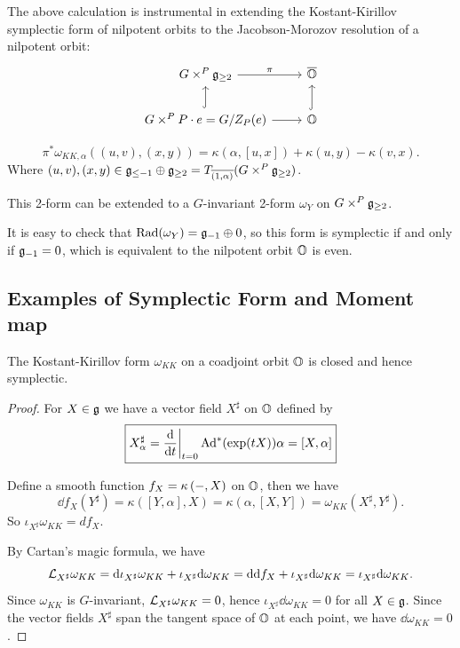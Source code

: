 The above calculation is instrumental in extending the Kostant-Kirillov symplectic form of nilpotent orbits to the Jacobson-Morozov resolution of a nilpotent orbit:
\[
\begin{tikzcd}
  G \times^P \fg_{\geq 2} \arrow[r, "\pi"] & \overline{\BO} \\
  G \times^{P}  P \cdot e = G/Z_P(e) \arrow[r] \arrow[u,hookrightarrow ] & \BO \arrow[u,hookrightarrow ]
\end{tikzcd}
\]

\[
  \pi^* \omega_{KK,\alpha}((u,v),(x,y)) = \kappa(\alpha, [u,x]) + \kappa(u,y) - \kappa(v,x).
\]
Where $(u,v), (x,y) \in \mathfrak{g}_{\leq -1} \oplus \mathfrak{g}_{\geq 2} = T_{\overline{(1,\alpha)}}(G \times^P \mathfrak{g}_{\geq 2})$.

This 2-form can be extended to a $G$-invariant 2-form $\omega_Y$ on $G \times^P \mathfrak{g}_{\geq 2}$.

It is easy to check that $\mathrm{Rad}(\omega_{Y}) = \mathfrak{g}_{-1} \oplus 0$, so this form is symplectic if and only if $\mathfrak{g}_{-1} = 0$, which is equivalent to the nilpotent orbit $\mathbb{O}$ is even.


\cite{Losev2022Topics}
\subsection{Examples of Symplectic Form and Moment map}

\begin{prop}
  The Kostant-Kirillov form $\omega_{KK}$ on a coadjoint orbit $\mathbb{O}$ is closed and hence symplectic.
\end{prop}

\begin{proof}
  For $X \in \mathfrak{g}$ we have a vector field $X^{\sharp}$ on $\mathbb{O}$ defined by
  \[
    \boxed{\displaystyle X^{\sharp}_{\alpha} = \frac{\mathrm{d}}{\mathrm{d} t} \bigg|_{t=0} \operatorname{Ad}^*(\exp(tX))\alpha = [X,\alpha]}
  \]

  Define a smooth function $f_{X} = \kappa \left(-,X\right)$ on $\mathbb{O}$, then we have
  \[  \dd f_{X}(Y^{\sharp}) = \kappa([Y,\alpha],X) = \kappa(\alpha,[X,Y]) = \omega_{KK}(X^{\sharp},Y^{\sharp}). \]
  So $\iota_{X^{\sharp}} \omega_{KK} = df_{X}$.

  By Cartan's magic formula, we have
  \[  \mathcal{L}_{X^{\sharp}} \omega_{KK} = \mathrm{d} \iota_{X^{\sharp}} \omega_{KK} + \iota_{X^{\sharp}} \mathrm{d} \omega_{KK} = \mathrm{d} \mathrm{d} f_{X} + \iota_{X^{\sharp}} \mathrm{d} \omega_{KK} = \iota_{X^{\sharp}} \mathrm{d} \omega_{KK}. \]
  Since $\omega_{KK}$ is $G$-invariant, $\mathcal{L}_{X^{\sharp}} \omega_{KK} = 0$, hence $\iota_{X^{\sharp}} \dd \omega_{KK} = 0$ for all $X \in \mathfrak{g}$. Since the vector fields $X^{\sharp}$ span the tangent space of $\mathbb{O}$ at each point, we have $\dd \omega_{KK} = 0$.
\end{proof}



